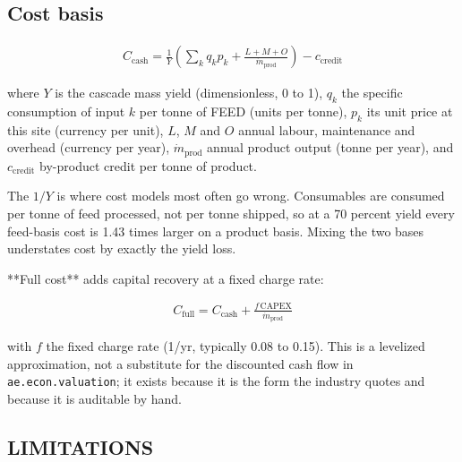 \documentclass[10pt,a4paper,twoside]{report}
\begin{document}
\subsection*{Cost basis}

\begin{equation*}
\begin{gathered}
C_{\mathrm{cash}} = \frac{1}{Y}\left( \sum_k q_k p_k + \frac{L + M + O}{\dot m_{\mathrm{prod}}}\right) - c_{\mathrm{credit}}
\end{gathered}
\end{equation*}

where $Y$ is the cascade mass yield (dimensionless, 0 to 1), $q_k$ the specific consumption of input $k$ per tonne of FEED (units per tonne), $p_k$ its unit price at this site (currency per unit), $L$, $M$ and $O$ annual labour, maintenance and overhead (currency per year), $\dot m_{\mathrm{prod}}$ annual product output (tonne per year), and $c_{\mathrm{credit}}$ by-product credit per tonne of product.

The $1/Y$ is where cost models most often go wrong. Consumables are consumed per tonne of feed processed, not per tonne shipped, so at a 70 percent yield every feed-basis cost is 1.43 times larger on a product basis. Mixing the two bases understates cost by exactly the yield loss.

**Full cost** adds capital recovery at a fixed charge rate:

\begin{equation*}
\begin{gathered}
C_{\mathrm{full}} = C_{\mathrm{cash}} + \frac{f\,\mathrm{CAPEX}}{\dot m_{\mathrm{prod}}}
\end{gathered}
\end{equation*}

with $f$ the fixed charge rate (1/yr, typically 0.08 to 0.15). This is a levelized approximation, not a substitute for the discounted cash flow in \texttt{ae.econ.valuation}; it exists because it is the form the industry quotes and because it is auditable by hand.

\subsection*{LIMITATIONS}
\end{document}
